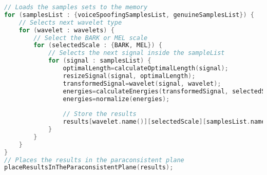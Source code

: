 \begin{lstlisting}[language=C++, caption={Procedure 1 algorithm}, label={lst:experiment01Algo}]
// Loads the samples sets to the memory
for (samplesList : {voiceSpoofingSamplesList, genuineSamplesList}) {
	// Selects next wavelet type
	for (wavelet : wavelets) {
		// Select the BARK or MEL scale
		for (selectedScale : {BARK, MEL}) {
			// Selects the next signal inside the sampleList
			for (signal : samplesList) {
				optimalLength=calculateOptimalLength(signal);
				resizeSignal(signal, optimalLength);
				transformedSignal=wavelet(signal, wavelet);
				energies=calculateEnergies(transformedSignal, selectedScale);
				energies=normalize(energies);
				
				// Store the results
				results[wavelet.name()][selectedScale][samplesList.name()].add(energies);
			}
		}
	}
}
// Places the results in the paraconsistent plane
placeResultsInTheParaconsistentPlane(results);
\end{lstlisting}